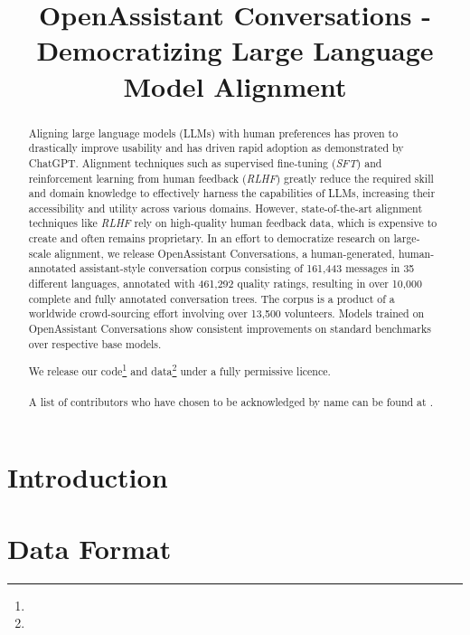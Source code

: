 \title{OpenAssistant Conversations - Democratizing Large Language Model Alignment}

\begin{abstract}
Aligning large language models (LLMs) with human preferences has proven to drastically improve usability and has driven rapid adoption as demonstrated by ChatGPT. Alignment techniques such as supervised fine-tuning (\textit{SFT}) and  reinforcement learning from human feedback (\textit{RLHF}) greatly reduce the required skill and domain knowledge to effectively harness the capabilities of LLMs, increasing their accessibility and utility across various domains. However, state-of-the-art alignment techniques like \textit{RLHF} rely on high-quality human feedback data, which is expensive to create and often remains proprietary. In an effort to democratize research on large-scale alignment, we release OpenAssistant Conversations, a human-generated, human-annotated assistant-style conversation corpus consisting of 161,443 messages in 35 different languages, annotated with 461,292 quality ratings, resulting in over 10,000 complete and fully annotated conversation trees. The corpus is a product of a worldwide crowd-sourcing effort involving over 13,500 volunteers. Models trained on OpenAssistant Conversations show consistent improvements on standard benchmarks over respective base models.

We release our code\footnote{\git} and data\footnote{\data} under a fully permissive licence.
\\
\\
A list of contributors who have chosen to be acknowledged by name can be found at \oacontributors.
\end{abstract}

\section{Introduction}
\label{sec:introduction}

\section{Data Format}


